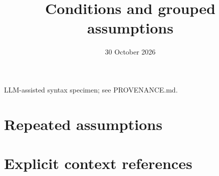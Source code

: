 \documentclass[11pt]{article}
\title{Conditions and grouped assumptions}
\author{}
\date{30 October 2026}
\begin{document}
\maketitle
\noindent LLM-assisted syntax specimen; see PROVENANCE.md.
\section*{Repeated assumptions}

\section*{Explicit context references}
\cleanreferencedtrue

\end{document}
